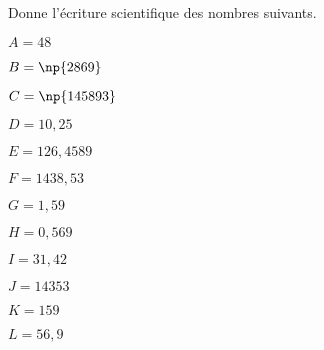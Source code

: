 
Donne l'écriture scientifique des nombres suivants.

\begin{description}
\begin{minipage}{0.3\linewidth}
\item $A=48$
\item $B=\np{2869}$
\item $C=\np{145893}$
\item $D=10,25$
\end{minipage}
\hfill
\begin{minipage}{0.3\linewidth}
\item $E=126,4589$
\item $F=1438,53$
\item $G=1,59$
\item $H=0,569$
\end{minipage}
\hfill
\begin{minipage}{0.3\linewidth}
\item $I=31,42$
\item $J=14353$
\item $K=159$
\item $L=56,9$
\end{minipage}
\end{description}
